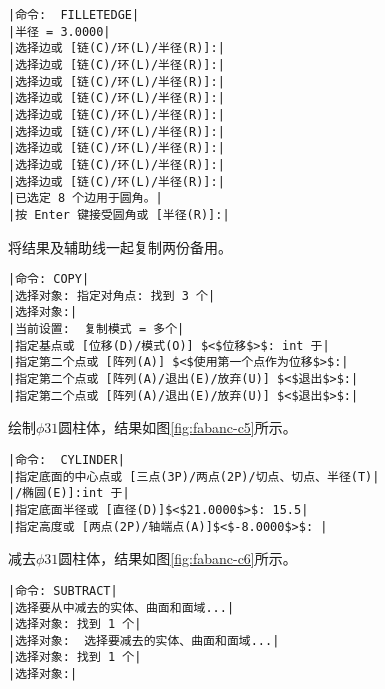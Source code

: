\begin{procedure}
\begin{lstlisting}
|命令:  FILLETEDGE|
|半径 = 3.0000|
|选择边或 [链(C)/环(L)/半径(R)]:|
|选择边或 [链(C)/环(L)/半径(R)]:|
|选择边或 [链(C)/环(L)/半径(R)]:|
|选择边或 [链(C)/环(L)/半径(R)]:|
|选择边或 [链(C)/环(L)/半径(R)]:|
|选择边或 [链(C)/环(L)/半径(R)]:|
|选择边或 [链(C)/环(L)/半径(R)]:|
|选择边或 [链(C)/环(L)/半径(R)]:|
|选择边或 [链(C)/环(L)/半径(R)]:|
|已选定 8 个边用于圆角。|
|按 Enter 键接受圆角或 [半径(R)]:|
\end{lstlisting}
\begin{figure}[htbp]
\centering
\begin{floatrow}[3]
\end{floatrow}
\end{figure}
\newpage
将结果及辅助线一起复制两份备用。
\begin{lstlisting}
|命令: COPY|
|选择对象: 指定对角点: 找到 3 个|
|选择对象:|
|当前设置:  复制模式 = 多个|
|指定基点或 [位移(D)/模式(O)] $<$位移$>$: int 于|
|指定第二个点或 [阵列(A)] $<$使用第一个点作为位移$>$:|
|指定第二个点或 [阵列(A)/退出(E)/放弃(U)] $<$退出$>$:|
|指定第二个点或 [阵列(A)/退出(E)/放弃(U)] $<$退出$>$:|
\end{lstlisting}
\item 绘制$\phi 31$圆柱体，结果如图\ref{fig:fabanc-c5}所示。
\begin{lstlisting}
|命令:  CYLINDER|
|指定底面的中心点或 [三点(3P)/两点(2P)/切点、切点、半径(T)|
|/椭圆(E)]:int 于|
|指定底面半径或 [直径(D)]$<$21.0000$>$: 15.5|
|指定高度或 [两点(2P)/轴端点(A)]$<$-8.0000$>$: |
\end{lstlisting}
\item 减去$\phi 31$圆柱体，结果如图\ref{fig:fabanc-c6}所示。
\begin{lstlisting}
|命令: SUBTRACT|
|选择要从中减去的实体、曲面和面域...|
|选择对象: 找到 1 个|
|选择对象:  选择要减去的实体、曲面和面域...|
|选择对象: 找到 1 个|
|选择对象:|
\end{lstlisting}
\end{procedure}
